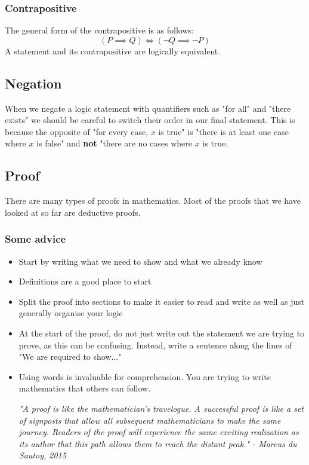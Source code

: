 \documentclass[12pt]{article}
\begin{document}
\subsubsection*{Contrapositive}
The general form of the contrapositive is as follows:
\[(P\implies Q)\iff (\lnot Q\implies \lnot P)\]
A statement and its contrapositive are logically equivalent.
\subsection*{Negation}
When we negate a logic statement with quantifiers such as "for all" and "there exists" we should be careful to switch their order in our final statement. This is because the opposite of "for every case, \(x\) is true" is "there is at least one case where \(x\) is false" and \textbf{not} "there are no cases where \(x\) is true.
\subsection*{Proof}
There are many types of proofs in mathematics. Most of the proofs that we have looked at so far are deductive proofs.
\subsubsection*{Some advice}
\begin{itemize}
    \item Start by writing what we need to show and what we already know
    \item Definitions are a good place to start
    \item Split the proof into sections to make it easier to read and write as well as just generally organise your logic
    \item At the start of the proof, do not just write out the statement we are trying to prove, as this can be confusing. Instead, write a sentence along the lines of "We are required to show..."
    \item Using words is invaluable for comprehension. You are trying to write mathematics that others can follow. 
    
    \textit{"A proof is like the mathematician’s travelogue. A successful proof is like a set of signposts that allow all subsequent mathematicians to make the same journey. Readers of the proof will experience the same exciting realization as its author that this path allows them to reach the distant peak." - Marcus du Sautoy, 2015}
\end{itemize}
\end{document}
